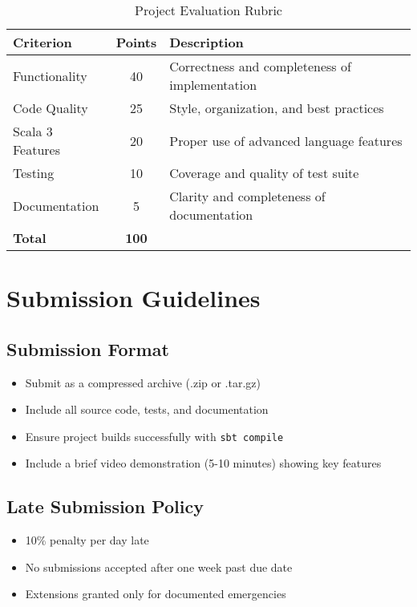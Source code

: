 \documentclass[11pt,a4paper]{article}
\begin{document}
\begin{table}[h]
\centering
\begin{tabular}{|l|c|l|}
\hline
\textbf{Criterion} & \textbf{Points} & \textbf{Description} \\
\hline
Functionality & 40 & Correctness and completeness of implementation \\
\hline
Code Quality & 25 & Style, organization, and best practices \\
\hline
Scala 3 Features & 20 & Proper use of advanced language features \\
\hline
Testing & 10 & Coverage and quality of test suite \\
\hline
Documentation & 5 & Clarity and completeness of documentation \\
\hline
\textbf{Total} & \textbf{100} & \\
\hline
\end{tabular}
\caption{Project Evaluation Rubric}
\end{table}

\section{Submission Guidelines}

\subsection{Submission Format}
\begin{itemize}
    \item Submit as a compressed archive (.zip or .tar.gz)
    \item Include all source code, tests, and documentation
    \item Ensure project builds successfully with \texttt{sbt compile}
    \item Include a brief video demonstration (5-10 minutes) showing key features
\end{itemize}

\subsection{Late Submission Policy}
\begin{itemize}
    \item 10\% penalty per day late
    \item No submissions accepted after one week past due date
    \item Extensions granted only for documented emergencies
\end{itemize}
\end{document}
